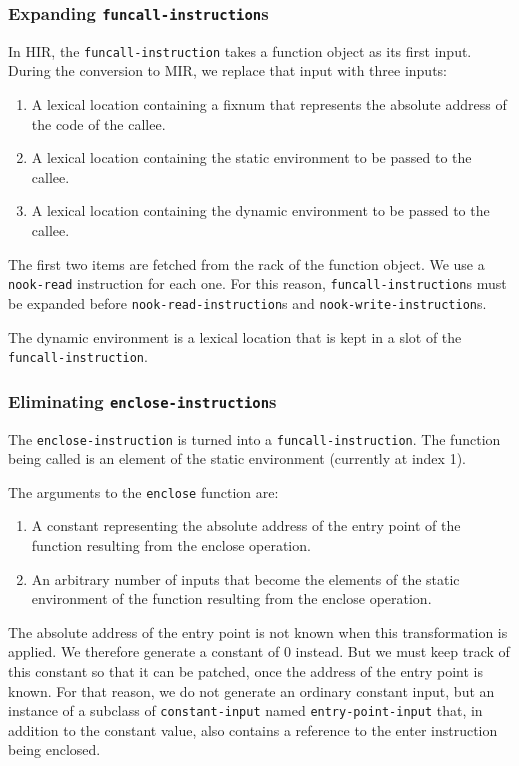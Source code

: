\subsubsection{Expanding \texttt{funcall-instruction}s}

In HIR, the \texttt{funcall-instruction} takes a function object as
its first input.  During the conversion to MIR, we replace that input
with three inputs:

\begin{enumerate}
\item A lexical location containing a fixnum that represents the
  absolute address of the code of the callee.
\item A lexical location containing the static environment to be
  passed to the callee.
\item A lexical location containing the dynamic environment to be
  passed to the callee.
\end{enumerate}

The first two items are fetched from the rack of the function object.
We use a \texttt{nook-read} instruction for each one.  For this
reason, \texttt{funcall-instruction}s must be expanded before
\texttt{nook-read-instruction}s and \texttt{nook-write-instruction}s.

The dynamic environment is a lexical location that is kept in a slot
of the \texttt{funcall-instruction}.

\subsubsection{Eliminating \texttt{enclose-instruction}s}

The \texttt{enclose-instruction} is turned into a
\texttt{funcall-instruction}.  The function being called is an element
of the static environment (currently at index 1).

The arguments to the \texttt{enclose} function are:

\begin{enumerate}
\item A constant representing the absolute address of the entry point
  of the function resulting from the enclose operation.
\item An arbitrary number of inputs that become the elements of the
  static environment of the function resulting from the enclose
  operation.
\end{enumerate}

The absolute address of the entry point is not known when this
transformation is applied.  We therefore generate a constant of 0
instead.  But we must keep track of this constant so that it can be
patched, once the address of the entry point is known.  For that
reason, we do not generate an ordinary constant input, but an instance
of a subclass of \texttt{constant-input} named
\texttt{entry-point-input} that, in addition to the constant value,
also contains a reference to the enter instruction being enclosed.

